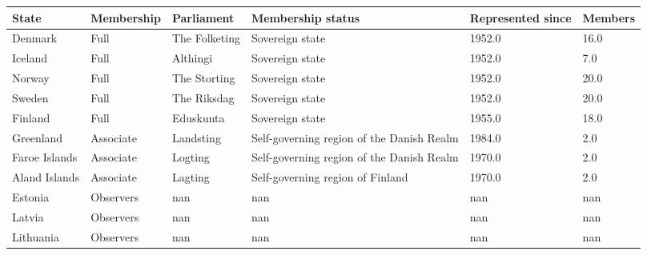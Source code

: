 \documentclass{article}
\begin{document}
\begin{tabular}{llllll}
\toprule
State & Membership & Parliament & Membership status & Represented since & Members \\
\midrule
Denmark & Full & The Folketing & Sovereign state & 1952.0 & 16.0 \\
Iceland & Full & Althingi & Sovereign state & 1952.0 & 7.0 \\
Norway & Full & The Storting & Sovereign state & 1952.0 & 20.0 \\
Sweden & Full & The Riksdag & Sovereign state & 1952.0 & 20.0 \\
Finland & Full & Eduskunta & Sovereign state & 1955.0 & 18.0 \\
Greenland & Associate & Landsting & Self-governing region of the Danish Realm & 1984.0 & 2.0 \\
Faroe Islands & Associate & Logting & Self-governing region of the Danish Realm & 1970.0 & 2.0 \\
Aland Islands & Associate & Lagting & Self-governing region of Finland & 1970.0 & 2.0 \\
Estonia & Observers & nan & nan & nan & nan \\
Latvia & Observers & nan & nan & nan & nan \\
Lithuania & Observers & nan & nan & nan & nan \\
\bottomrule
\end{tabular}
\end{document}
